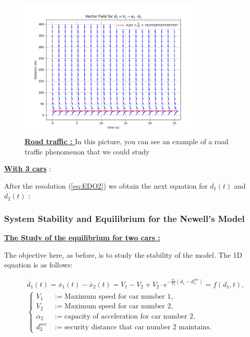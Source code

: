 \documentclass{article}
\begin{document}
		\begin{figure}[H]
			\centering
			\includegraphics[width=0.8\textwidth]{FieldOfVector_CV.png}
			\caption{\textbf{\underline{Road traffic : }} In this picture, you can see an example of a road traffic phenomenon that we could study}
			\label{fig:GitHub}
		\end{figure}
		
		\textbf{\underline{With 3 cars}} : \newline\newline
		
		After the resolution (\ref{eq:EDO2}) we obtain the next equation for $d_1(t)$ and $d_2(t)$ : 
		
	\subsubsection{System Stability and Equilibrium for the Newell's Model}
	
	\textbf{\underline{The Study of the equilibrium for two cars : }} \newline\newline
	
	
	The objective here, as before, is to study the stability of the model. The 1D equation is as follows:
	
	\begin{align*}
		&\dot{d_1}(t) = \dot{x_1}(t) - \dot{x_2}(t) = V_1 - V_2 + V_2 \cdot e^{-\frac{\alpha_2}{V_2}(d_1 - d_{2}^{sec})} = f(d_1, t), \\
		&\left\{
		\begin{aligned}
			V_1 &:= \text{Maximum speed for car number 1}, \\
			V_2 &:= \text{Maximum speed for car number 2}, \\
			\alpha_2 &:= \text{capacity of acceleration for car number 2}, \\
			d_{2}^{sec} &:= \text{security distance that car number 2 maintains}.
		\end{aligned}
		\right.
	\end{align*}
	
\end{document}
